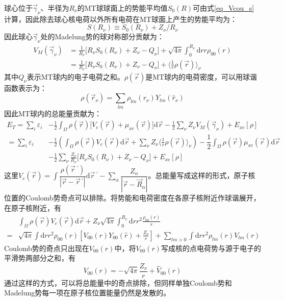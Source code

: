球心位于$\vec\gamma_{\nu}$、半径为$R_{\nu}$的\textrm{MT}球球面上的势能平均值$S_0(R)$可由式\eqref{eq_Vcou_s}计算，因此除去球心核电荷以外所有电荷在MT球面上产生的势能平均为：
\begin{equation}
  S(R_{\nu})\equiv S_0(R_{\nu})+Z_{\nu}/R_{\nu}
  \label{eq:solid-79}
\end{equation}
因此球心$\vec\gamma_{\nu}$处的\textrm{Madelung}势的球对称部分贡献为\cite{PRB26-4571_1982}：
\begin{equation}
  \begin{split}
	  V_M(\vec\gamma_{\nu})&=\frac1{R_{\nu}}\big[R_{\nu}S_0(R_{\nu})+Z_{\nu}-Q_{\nu}\big]+\sqrt{4\pi}\int_0^{R_{\nu}}\mathrm{d}rr\rho_{00}(r)\\
	   &=\frac1{R_{\nu}}\big[R_{\nu}S_0(R_{\nu})+Z_{\nu}-Q_{\nu}\big]+\bigg\langle\frac1r\rho(\vec r)\bigg\rangle_{\nu}
  \end{split}
   \label{eq:Madelung}
\end{equation}
其中$Q_{\nu}$表示\textrm{MT}球内的电子电荷之和。$\rho(\vec r)$是\textrm{MT}球内的电荷密度，可以用球谐函数表示为：
\begin{equation}
  \rho(\vec r_{\nu})=\sum_{lm}\rho_{lm}(r_{\nu})Y_{lm}(\hat r_{\nu})
  \label{eq:solid-80}
\end{equation}
因此\textrm{MT}球内的总能量贡献为：
\begin{equation}
  \begin{split}
	  E_T=\sum_i\varepsilon_i&-\frac12\int_{\Omega}\rho(\vec r)\big[V_c(\vec r)+\mu_{xc}(\vec r)\big]\mathrm{d}\vec r-\frac12\sum_{\nu}Z_{\nu}V_M(\vec\gamma_{\nu})+E_{xc}[\rho] \\
   =\sum_i\varepsilon_i&-\frac12\left(\int_{\Omega}\rho(\vec r)V_c(\vec r)\mathrm{d}\vec r+\sum_{\nu}Z_{\nu}\bigg\langle\frac1r\rho(\vec r)\bigg\rangle_{\nu}\right)-\dfrac12\int_{\Omega}\rho(\vec r)\mu_{xc}(\vec r)\mathrm{d}\vec r\\
   &-\frac12\sum_{\nu}\frac{Z_{\nu}}{R_{\nu}}\big[R_{\nu}S_0(R_{\nu})+Z_{\nu}-Q_{\nu}\big]+E_{xc}[\rho]
  \end{split}
  \label{eq:solid-81}
\end{equation}
这里$V_c(\vec r)=\displaystyle\int\dfrac{\rho(\vec r\,^\prime)}{|\vec r-\vec r\,^\prime|}\mathrm{d}\vec r\,^\prime-\sum\limits_{\alpha}\dfrac{Z_{\alpha}}{|\vec r-\vec R_{\alpha}|}$。总能量写成这样的形式，原子核位置的\textrm{Coulomb}势奇点可以排除。将势能和电荷密度在各原子核附近作球谐展开，在原子核附近，有
\begin{equation}
  \begin{split}
	  &\int_{\Omega}\rho(\vec r)V_c(\vec r)\mathrm{d}\vec r+Z_{\nu}\sqrt{4\pi}\int_0^{R_{\nu}}\mathrm{d}rr^2\frac{\rho_{00}(r)}r\\
	  =&\sqrt{4\pi}\int\mathrm{d}rr^2\rho_{00}(r)\left[V_{00}(r)Y_{00}(\hat r)+\frac{Z_{\nu}}r\right]+\sum_{lm>0}\int\mathrm{d}rr^2\rho_{lm}(r)V_{lm}(r)
  \end{split}
\end{equation}
\textrm{Coulomb}势的奇点只出现在$V_{00}(r)$中，将$V_{00}(r)$写成核的点电荷势与源于电子的平滑势两部分之和，有
$$V_{00}(r)=-\sqrt{4\pi}\frac{Z_{\nu}}r+\hat V_{00}(r)$$
通过这样的方式，可以将总能量中的奇点排除，但同样单独\textrm{Coulomb}势和\textrm{Madelung}势每一项在原子核位置能量仍然是发散的。


